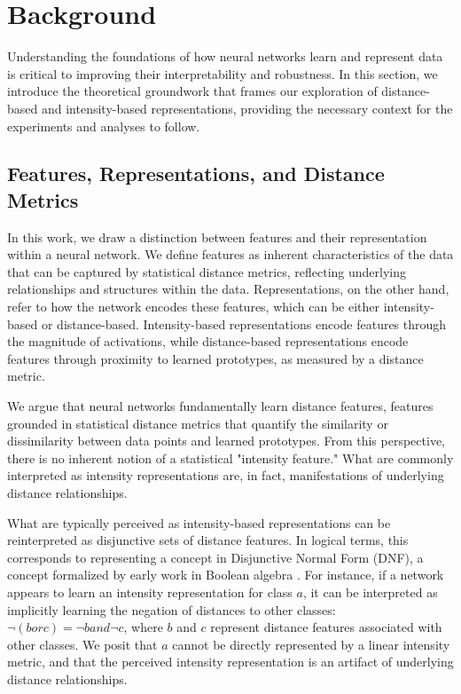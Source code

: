 \section{Background}
\label{sec:background}

Understanding the foundations of how neural networks learn and represent data is critical to improving their interpretability and robustness. In this section, we introduce the theoretical groundwork that frames our exploration of distance-based and intensity-based representations, providing the necessary context for the experiments and analyses to follow.

\subsection{Features, Representations, and Distance Metrics}

In this work, we draw a distinction between features and their representation within a neural network. We define features as inherent characteristics of the data that can be captured by statistical distance metrics, reflecting underlying relationships and structures within the data. Representations, on the other hand, refer to how the network encodes these features, which can be either intensity-based or distance-based. Intensity-based representations encode features through the magnitude of activations, while distance-based representations encode features through proximity to learned prototypes, as measured by a distance metric.

We argue that neural networks fundamentally learn distance features, features grounded in statistical distance metrics that quantify the similarity or dissimilarity between data points and learned prototypes. From this perspective, there is no inherent notion of a statistical "intensity feature." What are commonly interpreted as intensity representations are, in fact, manifestations of underlying distance relationships.

What are typically perceived as intensity-based representations can be reinterpreted as disjunctive sets of distance features. In logical terms, this corresponds to representing a concept in Disjunctive Normal Form (DNF), a concept formalized by early work in Boolean algebra \cite{post1921introduction}. For instance, if a network appears to learn an intensity representation for class $a$, it can be interpreted as implicitly learning the negation of distances to other classes: $\lnot(b or c) = \lnot b and \lnot c$, where $b$ and $c$ represent distance features associated with other classes. We posit that $a$ cannot be directly represented by a linear intensity metric, and that the perceived intensity representation is an artifact of underlying distance relationships.

